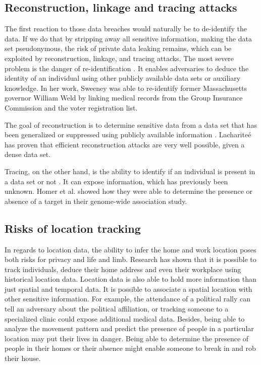 \subsection{Reconstruction, linkage and tracing attacks}
The first reaction to those data breaches would naturally be to de-identify the data. If we do that by stripping away all sensitive information, making the data set pseudonymous, the risk of private data leaking remains, which can be exploited by reconstruction, linkage, and tracing attacks. The most severe problem is the danger of re-identification \cite{reidentification}\cite{DBLP:journals/midm/EmamBTNJV11}\cite{DBLP:journals/midm/DankarENR12}.
It enables adversaries to deduce the identity of an individual using other publicly available data sets or auxiliary knowledge. 
In her work, Sweeney \cite{DBLP:journals/ijufks/Sweene02} was able to re-identify former Massachusetts governor William Weld by linking medical records from the Group Insurance Commission and the voter registration list.

The goal of reconstruction is to determine sensitive data from a data set that has been generalized or suppressed using publicly available information \cite{DBLP:journals/fttcs/DworkR14}\cite{exposed}. Lacharite\'e \cite{DBLP:conf/sp/LachariteMP18} has proven that efficient reconstruction attacks are very well possible, given a dense data set.
 
Tracing, on the other hand, is the ability to identify if an individual is present in a data set or not \cite{exposed}. It can expose information, which has previously been unknown. Homer et al. \cite{dna} showed how they were able to determine the presence or absence of a target in their genome-wide association study.

\subsection{Risks of location tracking}
In regards to location data, the ability to infer the home and work location poses both risks for privacy and life and limb. Research \cite{DBLP:conf/pervasive/Krumm07}\cite{DBLP:journals/corr/abs-1901-00897}\cite{DBLP:conf/pervasive/GolleP09} has shown that it is possible to track individuals, deduce their home address and even their workplace using historical location data.
Location data is also able to hold more information than just spatial and temporal data. It is possible to associate a spatial location with other sensitive information. For example, the attendance of a political rally can tell an adversary about the political affiliation, or tracking someone to a specialized clinic could expose additional medical data.
Besides, being able to analyze the movement pattern and predict the presence of people in a particular location may put their lives in danger. Being able to determine the presence of people in their homes or their absence might enable someone to break in and rob their house.

